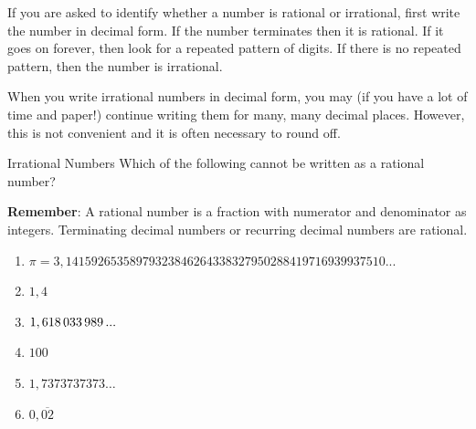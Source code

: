 \label{m38349*notfhsst!!!underscore!!!id128}
	\par
      \label{m38349*id324739}If you are asked to identify whether a number is rational or irrational, first write the number in decimal form. If the number terminates then it is rational. If it goes on forever, then look for a repeated pattern of digits. If there is no repeated pattern, then the number is irrational.\par 
      \label{m38349*id324745}When you write irrational numbers in decimal form, you may (if you have a lot of time and paper!) continue writing them for many, many decimal places. However, this is not convenient and it is often necessary to round off.\par 
\label{m38349*secfhsst!!!underscore!!!id133}


\begin{activity}{Irrational Numbers }
            \nopagebreak
      \label{m38349*id324757}Which of the following cannot be
written as a rational number?\par \vspace{0.5cm}
      \label{m38349*id324763}\textbf{Remember}: A rational number is a fraction with numerator and denominator as integers. Terminating decimal numbers or recurring decimal numbers are rational.\par 
      \label{m38349*id324775}\begin{enumerate}[itemsep=5pt, label=\textbf{\arabic*}. ] 
            \label{m38349*uid1}\item 
          $\pi =3,14159265358979323846264338327950288419716939937510...$
        \label{m38349*uid2}\item $1,4$
\label{m38349*uid3}\item 
          $1,618\phantom{\rule{0.166667em}{0ex}}033\phantom{\rule{0.166667em}{0ex}}989\phantom{\rule{0.166667em}{0ex}}...$
        \label{m38349*uid4}\item $100$
	\item $1,7373737373\ldots$
	\item $0,\overline{02}$
\end{enumerate}
\end{activity}


